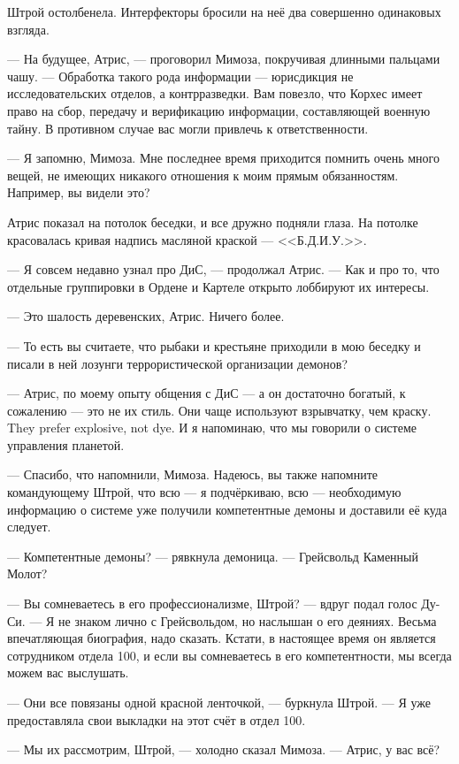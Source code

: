 Штрой остолбенела.
Интерфекторы бросили на неё два совершенно одинаковых взгляда.

--- На будущее, Атрис, --- проговорил Мимоза, покручивая длинными пальцами чашу.
--- Обработка такого рода информации --- юрисдикция не исследовательских отделов, а контрразведки.
Вам повезло, что Корхес имеет право на сбор, передачу и верификацию информации, составляющей военную тайну.
В противном случае вас могли привлечь к ответственности.

--- Я запомню, Мимоза.
Мне последнее время приходится помнить очень много вещей, не имеющих никакого отношения к моим прямым обязанностям.
Например, вы видели это?

Атрис показал на потолок беседки, и все дружно подняли глаза.
На потолке красовалась кривая надпись масляной краской --- <<Б.Д.И.У.>>.

--- Я совсем недавно узнал про ДиС, --- продолжал Атрис.
--- Как и про то, что отдельные группировки в Ордене и Картеле открыто лоббируют их интересы.

--- Это шалость деревенских, Атрис.
Ничего более.

--- То есть вы считаете, что рыбаки и крестьяне приходили в мою беседку и писали в ней лозунги террористической организации демонов?

--- Атрис, по моему опыту общения с ДиС --- а он достаточно богатый, к сожалению --- это не их стиль.
{Они чаще используют взрывчатку, чем краску.}
{They prefer explosive, not dye.}
И я напоминаю, что мы говорили о системе управления планетой.

--- Спасибо, что напомнили, Мимоза.
Надеюсь, вы также напомните командующему Штрой, что всю --- я подчёркиваю, всю --- необходимую информацию о системе уже получили компетентные демоны и доставили её куда следует.

--- Компетентные демоны? --- рявкнула демоница.
--- Грейсвольд Каменный Молот?

--- Вы сомневаетесь в его профессионализме, Штрой? --- вдруг подал голос Ду-Си.
--- Я не знаком лично с Грейсвольдом, но наслышан о его деяниях.
Весьма впечатляющая биография, надо сказать.
Кстати, в настоящее время он является сотрудником отдела 100, и если вы сомневаетесь в его компетентности, мы всегда можем вас выслушать.

--- Они все повязаны одной красной ленточкой, --- буркнула Штрой.
--- Я уже предоставляла свои выкладки на этот счёт в отдел 100.

--- Мы их рассмотрим, Штрой, --- холодно сказал Мимоза.
--- Атрис, у вас всё?

